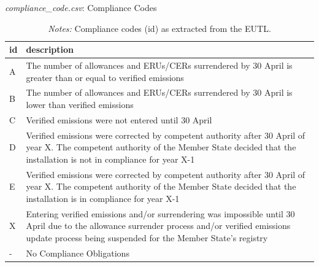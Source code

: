 \documentclass[authoryear]{elsarticle}
\begin{document}
\begin{table}[htbp]\scriptsize
	\caption{\textit{compliance\_code.csv}: Compliance Codes}\label{tab:complianceCode}
	\centering
	\begin{tabular*}{\textwidth}{@{}@{\extracolsep{\fill}} lp{10cm} @{}}
		\toprule
		\toprule
		\textbf{id} & \textbf{description} \\
		\midrule
		A     & The number of allowances and ERUs/CERs surrendered by 30 April is greater than or equal to verified emissions \\
		B     & The number of allowances and ERUs/CERs surrendered by 30 April is lower than verified emissions \\
		C     & Verified emissions were not entered until 30 April \\
		D     & Verified emissions were corrected by competent authority after 30 April of year X. The competent authority of the Member State decided that the installation is not in compliance for year X-1 \\
		E     & Verified emissions were corrected by competent authority after 30 April of year X. The competent authority of the Member State decided that the installation is in compliance for year X-1 \\
		X     & Entering verified emissions and/or surrendering was impossible until 30 April due to the allowance surrender process and/or verified emissions update process being suspended for the Member State's registry \\
		-     & No Compliance Obligations \\
		\bottomrule
		\bottomrule
	\end{tabular*}%
	\vspace{-3ex}
	\caption*{\footnotesize \emph{Notes:} Compliance codes (id) as extracted from the EUTL.}
	\vspace{0ex}
\end{table}%
\end{document}
